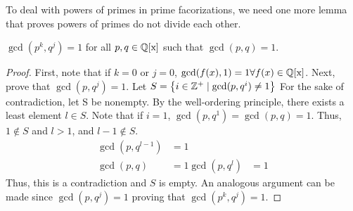 To deal with powers of primes in prime facorizations, we need one more lemma that proves powers of primes do not divide each other.
\begin{lemma}
    $ \gcd(p^k, q^j) = 1$ for all $p, q \in \operatorname{\mathbb{Q}[x]}$ such that $\gcd(p, q) = 1$.
\end{lemma}
\begin{proof}
    First, note that if $k=0$ or $j=0$, $\operatorname{gcd}(f(x), 1) = 1 \forall f(x)\in \operatorname{\mathbb{Q}[x]}$.
    Next, prove that $\gcd(p, q^j) = 1$. Let $S=\left\{i \in \mathbb{Z}^+\mid \operatorname{gcd}(p, q^i) \neq 1 \right\}$ For the sake of contradiction, let S be nonempty. By the well-ordering principle, there exists a least element $l \in S$.
    Note that if $i=1$,  $\gcd(p, q^1) = \gcd(p, q) = 1$. Thus, $1 \notin S$ and $l>1$, and $l-1 \notin S$.
    \begin{align*}
        \gcd(p, q^{l-1}) &= 1 \\
        \gcd(p, q) &= 1
        \gcd(p, q^l) &= 1
    \end{align*}
    Thus, this is a contradiction and $S$ is empty. An analogous argument can be made since  $\gcd(p, q^j) = 1$ proving that $ \gcd(p^k, q^j) = 1$.
\end{proof}


